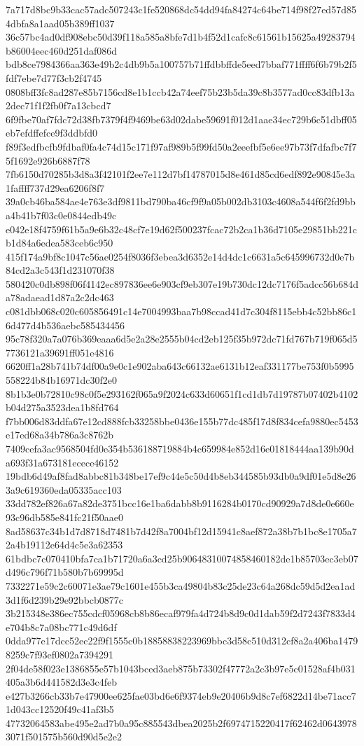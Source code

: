 {7a717d8bc9b33cac57adc507243c1fe520868dc54dd94fa84274c64be714f98f27ed57d854dbfa8a1aad05b389ff1037
36c57bc4ad0df908ebc50d39f118a585a8bfe7d1b4f52d1cafc8c61561b15625a49283794b86004eec460d251daf086d
bdb8ce7984366aa363e49b2c4db9b5a100757b71ffdbbffde5eed7bbaf771ffff6f6b79b2f5fdf7ebe7d77f3cb2f4745
0808bff3fc8ad287e85b7156cd8e1b1ccb42a74eef75b23b5da39c8b3577ad0cc83dfb13a2dec71f1f2fb0f7a13cbcd7
6f9fbe70af7fdc72d38fb7379f4f9469be63d02dabe59691f012d1aae34ec729b6c51dbff05eb7efdffefce9f3ddbfd0
f89f3edfbcfb9fdbaf0fa4c74d15c171f97af989b5f99fd50a2eeefbf5e6ee97b73f7dfafbc7f75f1692e926b6887f78
7fb6150d70285b3d8a3f42101f2ee7e112d7bf14787015d8e461d85cd6edf892e90845e3a1faffff737d29ea6206f8f7
39a0cb46ba584ae4e763e3df9811bd790ba46cf9f9a05b002db3103c4608a544f6f2fd9bba4b41b7f03c0e0844edb49c
e042e18f4759f61b5a9e6b32c48cf7e19d62f500237fcac72b2ca1b36d7105e29851bb221cb1d84a6edea583ceb6c950
415f174a9bf8c1047c56ae0254f8036f3ebea3d6352e14d4dc1c6631a5c645996732d0e7b84cd2a3c543f1d231070f38
580420c0db898f06f4142ec897836ee6e903cf9eb307e19b730dc12dc7176f5adcc56b684da78adaead1d87a2c2dc463
c081dbb068c020c605856491c14e7004993baa7b98ccad41d7c304f8115ebb4c52bb86c16d477d4b536aebc585434456
95c78f320a7a076b369eaaa6d5e2a28e2555b04cd2eb125f35b972dc71fd767b719f065d57736121a39691ff051e4816
6620ff1a28b741b74df00a9e0c1e902aba643c66132ae6131b12eaf331177be753f0b5995558224b84b16971dc30f2e0
8b1b3e0b72810c98c0f5e293162f065a9f2024c633d60651f1cd1db7d19787b07402b4102b04d275a3523dea1b8fd764
f7bb006d83ddfa67e12cd888fcb33258bbe0436e155b77dc485f17d8f834cefa9880ec5453e17ed68a34b786a3c8762b
7409cefa3ac9568504fd0e354b536188719884b4c659984e852d16e01818444aa139b90da693f31a673181ecece46152
19bdb6d49af8fad8abbc81b348be17ef9c44e5c50d4b8eb344585b93db0a9df01e5d8e263a9c619360eda05335acc103
33dd782ef826a67a82de3751bcc16e1ba6dabb8b9116284b0170cd90929a7d8de0e660e93c96db585e841fc21f50aae0
8ad58637c34b1d7d8718d7481b7d42f8a7004bf12d15941c8aef872a38b7b1bc8e1705a72a4b19112e64d4c5e3a62353
61bdbc7c070410bfa7ca1b71720a6a3cd25b90648310074858460182de1b85703ec3eb07d496c796f71b580b7b69995d
7332271e59c2c60071e3ae79c1601e455b3ca49804b83c25de23c64a268dc59d5d2ea1ad3d1f6d239b29e92bbcb0877c
3b215348e386ec755cdcf05968cb8b86ecaf979fa4d724b8d9c0d1dab59f2d7243f7833d4e704b8c7a08bc771c49d6df
0dda977e17dcc52ec22f9f1555c0b18858838223969bbc3d58c510d312cf8a2a406ba14798259c7f93ef0802a7394291
2f04de58f023e1386855e57b1043bced3aeb875b73302f47772a2c3b97e5c01528af4b031405a3b6d441582d3e3c4feb
e427b3266cb33b7e47900ee625fae03bd6e6f9374eb9e20406b9d8c7ef6822d14be71acc71d043cc12520f49c41af3b5
47732064583abe495e2ad7b0a95c885543dbea2025b2f6974715220417f62462d06439783071f501575b560d90d5e2e2
}
